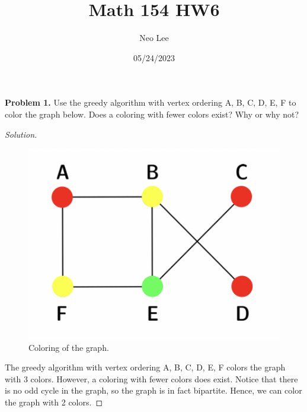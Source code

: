 \documentclass{article}
\title{Math 154 HW6}
\author{Neo Lee}
\date{05/24/2023}
\begin{document}
 

\maketitle 

\textbf{Problem 1.}
Use the greedy algorithm with vertex ordering A, B, C, D, E, F to color the graph below. 
Does a coloring with fewer colors exist? Why or why not?
\begin{proof}[Solution] \indent 
    \begin{figure}[htb!]
        \centering
        \includegraphics[scale=0.5]{coloring.png}
        \caption{Coloring of the graph.}
    \end{figure}

    The greedy algorithm with vertex ordering A, B, C, D, E, F colors the graph with 3 colors.
    However, a coloring with fewer colors does exist.
    Notice that there is no odd cycle in the graph, so the graph is in fact bipartite.
    Hence, we can color the graph with 2 colors.
\end{proof}
\bigbreak
\end{document}
